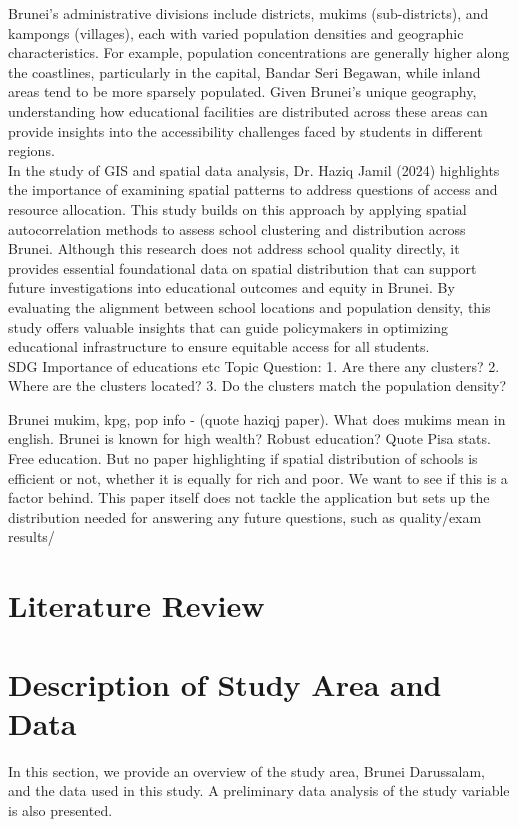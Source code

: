 \documentclass[12pt]{article}
\begin{document}
Brunei’s administrative divisions include districts, mukims (sub-districts), and kampongs (villages), each with varied population densities and geographic characteristics. For example, population concentrations are generally higher along the coastlines, particularly in the capital, Bandar Seri Begawan, while inland areas tend to be more sparsely populated. Given Brunei’s unique geography, understanding how educational facilities are distributed across these areas can provide insights into the accessibility challenges faced by students in different regions. \\

In the study of GIS and spatial data analysis, Dr. Haziq Jamil (2024) highlights the importance of examining spatial patterns to address questions of access and resource allocation. This study builds on this approach by applying spatial autocorrelation methods to assess school clustering and distribution across Brunei. Although this research does not address school quality directly, it provides essential foundational data on spatial distribution that can support future investigations into educational outcomes and equity in Brunei. By evaluating the alignment between school locations and population density, this study offers valuable insights that can guide policymakers in optimizing educational infrastructure to ensure equitable access for all students. \\

SDG
Importance of educations etc
Topic Question:
	1. Are there any clusters?
	2. Where are the clusters located?
	3. Do the clusters match the population density?

Brunei mukim, kpg, pop info -  (quote haziqj paper). What does mukims mean in english.
Brunei is known for high wealth? Robust education? Quote Pisa stats. Free education. But no paper highlighting if spatial distribution of schools is efficient or not, whether it is equally for rich and poor. We want to see if this is a factor behind. This paper itself does not tackle the application but sets up the distribution needed for answering any future questions, such as quality/exam results/

\section{Literature Review}
\label{sec: lit rev}
 

\section{Description of Study Area and Data}
\label{sec: study area and data}
In this section, we provide an overview of the study area, Brunei Darussalam, and the data used in this study. A preliminary data analysis of the study variable is also presented.
\end{document}
